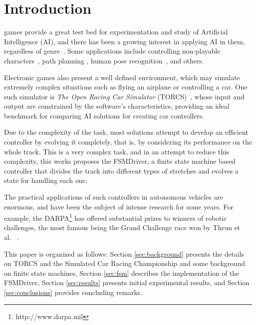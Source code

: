 \section{Introduction}\label{sec:intro}
 games provide a great test bed for experimentation and 
study of Artificial Intelligence (AI), and there has been a growing interest in 
applying AI in them, regardless of genre~\cite{simon2008}. Some applications 
include controlling non-playable characters~\cite{stanley2005}, path planning 
\cite{freitas2012}, human pose recognition~\cite{shotton2011}, and others. 

Electronic games also present a well defined environment, which may simulate 
extremely complex situations such as flying an airplane or controlling a car. One such simulator is \emph{The Open Racing Car Simulator} (TORCS)~\cite{TORCS}, whose input and output are constrained by the software's characteristics, providing an ideal benchmark for comparing AI solutions for creating car controllers.

Due to  the complexity of the task, most solutions attempt to develop an efficient
controller by evolving it completely, that is, by considering its performance on
the whole track. This is a very complex task, and in an attempt to
reduce this complexity, this works proposes the FSMDriver, a finite state machine 
based controller that divides the track into different types of stretches and 
evolves a state for handling each one.

The practical applications of such controllers in autonomous vehicles are enormous, 
and have been the subject of intense research for some years. For example, the 
DARPA\footnote{http://www.darpa.mil} has offered substantial prizes to winners of 
robotic challenges, the most famous being the Grand Challenge race won by Thrun 
et al.~\cite{Thrun06} .

This paper is organized as follows: Section \ref{sec:background} presents the details on TORCS and 
the Simulated Car Racing Championship and some background on finite state machines,
Section \ref{sec:fsm} describes the implementation of the FSMDriver, Section \ref{sec:results} presents 
initial experimental results, and Section \ref{sec:conclusions} provides concluding remarks.
